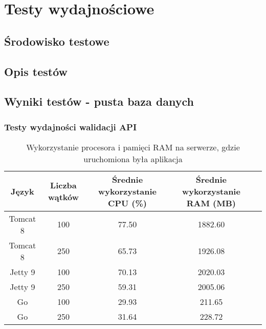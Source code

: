 \chapter{Testy wydajnościowe}
\section{Środowisko testowe}
\section{Opis testów}
\section{Wyniki testów - pusta baza danych}

\newpage
\subsection{Testy wydajności walidacji API}

\clearpage

\begin{table}[!htb]
\centering
\caption{Wykorzystanie procesora i pamięci RAM na serwerze, gdzie uruchomiona była aplikacja}
\label{tab:app-clean-api}
\begin{tabular}{@{}ccccl@{}}
\toprule
\textbf{Język} & \textbf{Liczba wątków} & \multicolumn{1}{p{3cm}}{\textbf{Średnie wykorzystanie CPU (\%)}} & \multicolumn{1}{p{3cm}}{\textbf{Średnie wykorzystanie RAM (MB)}} &  \\ \midrule
Tomcat 8       & 100                    & 77.50                             & 1882.60                          &  \\
Tomcat 8       & 250                    & 65.73                             & 1926.08                          &  \\
Jetty 9       & 100                    & 70.13                             & 2020.03                          &  \\
Jetty 9       & 250                    & 59.31                             & 2005.06                          &  \\
Go       & 100                    & 29.93                             & 211.65                          &  \\
Go       & 250                    & 31.64                             & 228.72                          &  \\
\bottomrule
\end{tabular}
\end{table}

